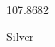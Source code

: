 \documentclass[12pt]{article}
\begin{document}
\hfill{}
\vfill
\begin{center}
  {\fontsize{50}{60}
  }

  \vspace{1em}

  107.8682

Silver
\end{center}
\vfill
\end{document}
